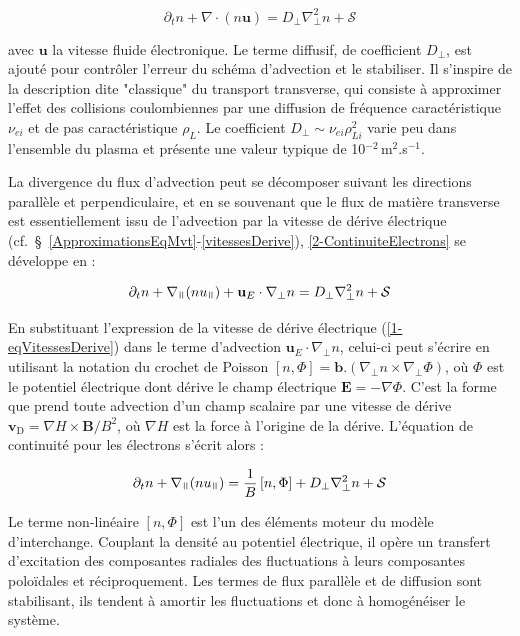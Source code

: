 \begin{refsection}
\begin{equation}
\label{2-ContinuiteElectrons}
\partial_t n + \nabla\cdot(n\mathbf{u}) = D_\perp\nabla^2_\perp n + \mathcal{S}
\end{equation}

avec $\mathbf u$ la vitesse fluide électronique. Le terme diffusif, de
coefficient $D_\perp$, est ajouté pour contrôler l'erreur du schéma d'advection et le stabiliser. Il s'inspire de la description
dite "classique" du transport transverse, qui consiste à approximer l'effet des
collisions coulombiennes par une diffusion de fréquence caractéristique
$\nu_{ei}$ et de pas caractéristique $\rho_{L}$. Le coefficient
$D_\perp\sim\nu_{ei}\rho_{Li}^2$ varie peu dans l'ensemble du plasma et présente
une valeur typique de 10$^{-2}\,$m$^2$.s$^{-1}$.

La divergence du flux d'advection peut se décomposer suivant les directions
parallèle et perpendiculaire, et en se souvenant que le flux de matière transverse est
essentiellement issu de l'advection par la vitesse de dérive électrique
(cf.~\S~\ref{ApproximationsEqMvt}-\ref{vitessesDerive}), \eqref{2-ContinuiteElectrons}
se développe en :

\begin{equation}
\label{2-ContinuiteElectrons2}
\partial_t n + \nabla_\para(nu_{\para}) +
\mathbf{u}_E\cdot\nabla_\perp n = D_\perp\nabla^2_\perp n + \mathcal{S}
\end{equation}

En substituant l'expression de la vitesse de dérive électrique
(\eqref{1-eqVitessesDerive}) dans le terme d'advection
$\mathbf{u}_E\cdot\nabla_\perp n$, celui-ci peut s'écrire en utilisant la
notation du crochet de Poisson $[n,\Phi]=\mathbf{b}.(\nabla_\perp
n\times\nabla_\perp\Phi)$, où $\Phi$ est le potentiel
électrique dont dérive le champ électrique $\mathbf E=-\nabla\Phi$. C'est la
forme que prend toute advection d'un champ scalaire par une vitesse de dérive
$\mathbf{v}_\text{D}=\nabla H\times\mathbf{B}/B^2$, où $\nabla H$ est la force
à l'origine de la dérive. L'équation de continuité pour les électrons s'écrit alors :

\begin{equation}
\label{2-eqContinuiteFinale}
\partial_t n + \nabla_{\para}(nu_{\para}) =
\frac{1}{B}\left[n,\Phi\right] + D_\perp\nabla^2_\perp n + \mathcal{S}
\end{equation}

Le terme non-linéaire $[n,\Phi]$ est l'un des éléments moteur du modèle
d'interchange. Couplant la densité au potentiel électrique, il opère un
transfert d'excitation des composantes radiales des fluctuations à leurs
composantes poloïdales et réciproquement. Les termes de flux parallèle et de
diffusion sont stabilisant, ils tendent à
amortir les fluctuations et donc à homogénéiser le système.


\end{refsection}
